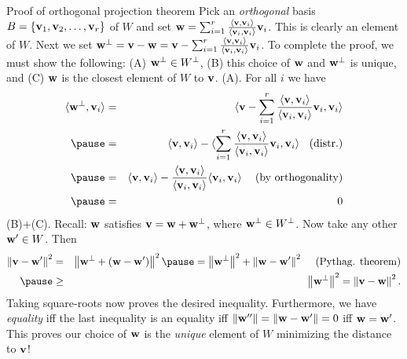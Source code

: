 \begin{frame}{Proof of orthogonal projection theorem}\scriptsize
Pick an {\em orthogonal} basis $B=\{{\mathbf v}_1,{\mathbf v}_2,\dots, {\mathbf v}_r\}$ of $W$ and set ${\mathbf w}=\sum_{i=1}^r\frac{\langle {\mathbf v},{\mathbf v}_i\rangle}{\langle {\mathbf v}_i, {\mathbf v}_i\rangle}{\mathbf v}_i$. This is clearly an element of $W$. Next we set ${\mathbf w}^\perp={\mathbf v}-{\mathbf w}={\mathbf v}-\sum_{i=1}^r\frac{\langle {\mathbf v},{\mathbf v}_i\rangle}{\langle {\mathbf v}_i, {\mathbf v}_i\rangle}{\mathbf v}_i$. 
\bpause
To complete the proof, we must show the following: (A) ${\mathbf w}^\perp\in W^\perp$, (B) this choice of ${\mathbf w}$ and ${\mathbf w}^\perp$ is unique, and (C) ${\mathbf w}$ is the closest element of $W$ to ${\mathbf v}$. 
\bpause 
\alert{(A)}. For all $i$ we have 
\begin{eqnarray*}
\langle\boldw^\perp,\boldv_i\rangle&=&\langle \boldv-\sum_{i=1}^r\frac{\angvec{\boldv,\boldv_i}}{\angvec{\boldv_i, \boldv_i}}\boldv_i, \boldv_i\rangle\\
\pause&=&\langle \boldv, \boldv_i\rangle-\langle \sum_{i=1}^r\frac{\angvec{\boldv,\boldv_i}}{\angvec{\boldv_i, \boldv_i}}\boldv_i ,\boldv_i\rangle \hspace{9pt} \text{(distr.)}\\
\pause&=&\langle \boldv, \boldv_i\rangle-\frac{\angvec{\boldv,\boldv_i}}{\angvec{\boldv_i,\boldv_i}}\langle\boldv_i,\boldv_i\rangle \hspace{9pt} \text{ (by orthogonality)}\\
\pause&=&0 
\end{eqnarray*}
\pause
\alert{(B)+(C)}. Recall: ${\mathbf w}$ satisfies ${\mathbf v}={\mathbf w}+{\mathbf w}^\perp$, where ${\mathbf w}^\perp\in W^\perp$. Now take any other ${\mathbf w}'\in W$. Then 
\begin{eqnarray*}
\norm{\boldv-\boldw'}^2&=&\norm{\boldw^\perp+(\boldw-\boldw')}^2
\pause=\norm{\boldw^\perp}^2+\norm{\boldw-\boldw'}^2 \hspace{9pt} \text{ (Pythag. theorem)}\\
\pause&\geq& \norm{\boldw^\perp}^2=\norm{\boldv-\boldw}^2.
\end{eqnarray*}
\pause Taking square-roots now proves the desired inequality. 
Furthermore, we have {\em equality} iff the last inequality is an equality iff $\left\lVert{\mathbf w}''\right\rVert=\left\lVert{\mathbf w}-{\mathbf w}'\right\rVert=0$ iff ${\mathbf w}={\mathbf w}'$. This proves our choice of ${\mathbf w}$ is the {\em unique} element of $W$ minimizing the distance to ${\mathbf v}$!  
\end{frame}
